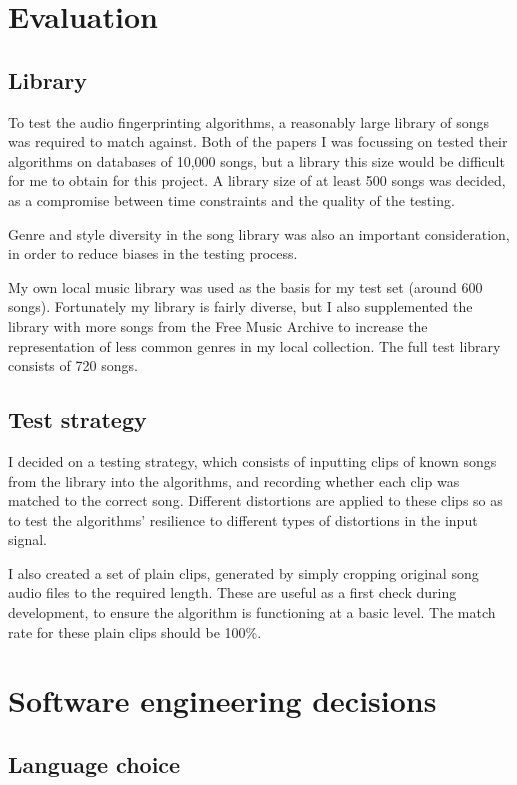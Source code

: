 \documentclass[12pt,a4paper,twoside,openright]{report}
\begin{document}
\section{Evaluation}

\subsection{Library}

To test the audio fingerprinting algorithms, a reasonably large library of songs was required to match against. Both of the papers I was focussing on tested their algorithms on databases of 10,000 songs, but a library this size would be difficult for me to obtain for this project. A library size of at least 500 songs was decided, as a compromise between time constraints and the quality of the testing.

Genre and style diversity in the song library was also an important consideration, in order to reduce biases in the testing process.

My own local music library was used as the basis for my test set (around 600 songs). Fortunately my library is fairly diverse, but I also supplemented the library with more songs from the Free Music Archive to increase the representation of less common genres in my local collection. The full test library consists of 720 songs.

\subsection{Test strategy}

I decided on a testing strategy, which consists of inputting clips of known songs from the library into the algorithms, and recording whether each clip was matched to the correct song. Different distortions are applied to these clips so as to test the algorithms' resilience to different types of distortions in the input signal.

I also created a set of plain clips, generated by simply cropping original song audio files to the required length. These are useful as a first check during development, to ensure the algorithm is functioning at a basic level. The match rate for these plain clips should be 100\%.


\section{Software engineering decisions}

\subsection{Language choice}
\end{document}
